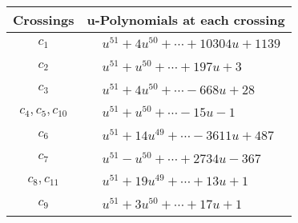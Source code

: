 \documentclass[1p]{elsarticle_modified}
\theoremstyle{definition}
\begin{document}
\begin{tabular}{m{50pt}|m{274pt}}
Crossings & \hspace{64pt}u-Polynomials at each crossing \\
\hline $$\begin{aligned}c_{1}\end{aligned}$$&$\begin{aligned}
&u^{51}+4 u^{50}+\cdots+10304 u+1139
\end{aligned}$\\
\hline $$\begin{aligned}c_{2}\end{aligned}$$&$\begin{aligned}
&u^{51}+u^{50}+\cdots+197 u+3
\end{aligned}$\\
\hline $$\begin{aligned}c_{3}\end{aligned}$$&$\begin{aligned}
&u^{51}+4 u^{50}+\cdots-668 u+28
\end{aligned}$\\
\hline $$\begin{aligned}c_{4},c_{5},c_{10}\end{aligned}$$&$\begin{aligned}
&u^{51}+u^{50}+\cdots-15 u-1
\end{aligned}$\\
\hline $$\begin{aligned}c_{6}\end{aligned}$$&$\begin{aligned}
&u^{51}+14 u^{49}+\cdots-3611 u+487
\end{aligned}$\\
\hline $$\begin{aligned}c_{7}\end{aligned}$$&$\begin{aligned}
&u^{51}- u^{50}+\cdots+2734 u-367
\end{aligned}$\\
\hline $$\begin{aligned}c_{8},c_{11}\end{aligned}$$&$\begin{aligned}
&u^{51}+19 u^{49}+\cdots+13 u+1
\end{aligned}$\\
\hline $$\begin{aligned}c_{9}\end{aligned}$$&$\begin{aligned}
&u^{51}+3 u^{50}+\cdots+17 u+1
\end{aligned}$\\
\hline
\end{tabular}\\~\\
\end{document}
